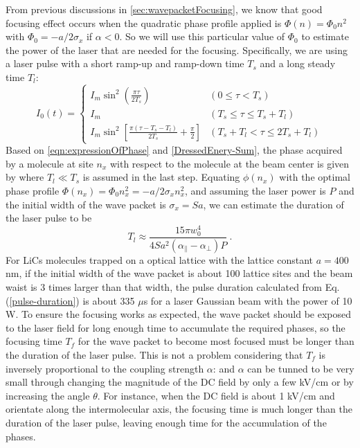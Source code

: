 From previous
discussions in \autoref{sec:wavepacketFocusing}, we know that good focusing effect occurs when the quadratic 
phase profile applied is $\Phi(n) = \Phi_0 n^2$ with $\Phi_0 = -a/2\sigma_x$ if $\alpha<0$. So we will use this
 particular value of $\Phi_0$ to estimate the power of the laser that are needed for the focusing.  
Specifically, we are using a laser pulse with a short ramp-up and
ramp-down time $T_s$ and a long steady time $T_l$:
\begin{equation}
I_0 (t)=\left\{
\begin{array}{ll}
I_{m}\sin^2\left(\frac{\pi\tau}{2 T_{s}}\right) & (0\le \tau<T_s) \\
I_{m} & (T_s \le \tau \le T_s + T_{l}) \\
I_{m}\sin^2\left[\frac{\pi(\tau- T_s - T_{l}) }{2 T_{s}} +
\frac{\pi}{2}\right] & (T_s+ T_{l}<\tau \le 2T_s+ T_{l})
\end{array}
\right. \label{pulse-profile}
\end{equation}
Based on \autoref{eqn:expressionOfPhase} and \autoref{DressedEnery-Sum}, the phase acquired by a molecule
at site $n_x$ with respect to the molecule at the beam center is given by
where $T_{l} \ll T_{s}$ is assumed in the last step. Equating $\phi(n_x)$ with the optimal phase profile 
$\Phi(n_x) = \Phi_0 n_x^2 = -a/2\sigma_x n_x^2$,
and assuming the laser power is $P$ and the initial width of the wave
packet is $\sigma_x = S a$, we can estimate the
duration of the laser pulse to be
\begin{equation}
T_l \approx \frac{15 \pi
w_0^4}{4 Sa^2(\alpha_{\|}-\alpha_\perp)P} \ .
\label{pulse-duration}
\end{equation}
For LiCs molecules trapped on a optical lattice with the lattice constant $a = 400 $nm, if the initial width of the 
wave packet is about 100 lattice sites and the beam waist is 3 times larger than that width,  the
pulse duration calculated from Eq. (\ref{pulse-duration}) is about
335 $\mu$s for a laser Gaussian beam with the power of 10 W. To ensure the focusing works
as expected, the wave packet should be exposed to the laser field for long enough time to accumulate the required phases, so the focusing time $T_f$ for the wave packet to become
most focused must be longer than the duration of the laser pulse.
This is not a problem considering that $T_f$ is inversely
proportional to the coupling strength $\alpha$:
and $\alpha$ can be tunned to be very small through changing the magnitude of the DC field
\cite{felipe} by only a few kV/cm or by increasing the angle $\theta$. For instance, when the DC field is about 1 kV/cm and orientate along the intermolecular axis,  the focusing time 
is much longer than the duration of the laser pulse, leaving enough time for the accumulation of the phases. 

